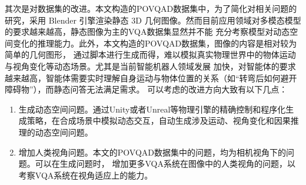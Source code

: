 其次是对数据集的改进。本文构造的POVQAD数据集中，为了简化对相关问题的研究，采用 Blender 引擎渲染静态 3D 几何图像。然而目前应用领域对多模态模型的要求越来越高，静态图像为主的VQA数据集显然并不能
充分考察模型对动态空间变化的推理能力。此外，本文构造的POVQAD数据集，图像的内容是相对较为简单的几何图形，
通过脚本进行生成而得，难以模拟真实物理世界中的物体运动与视角变化等动态场景。尤其是当前智能机器人领域发展
加快，对智能体的要求越来越高，智能体需要实时理解自身运动与物体位置的关系（如“转弯后如何避开障碍物”），而静态问答无法满足需求。
可以考虑的改进方向大致有以下几点：
\begin{enumerate}[nosep]
    \item 生成动态空间问题。通过Unity或者Unreal等物理引擎的精确控制和程序化生成策略，在合成场景中模拟动态交互，自动生成涉及运动、视角变化和因果推理的动态空间问题。
    \item 增加人类视角问题。本文的POVQAD数据集中的问题，均为相机视角下的问题。可以在生成问题时，
增加更多VQA系统在图像中的人类视角的问题，以考察VQA系统在视角适应上的能力。
\end{enumerate}